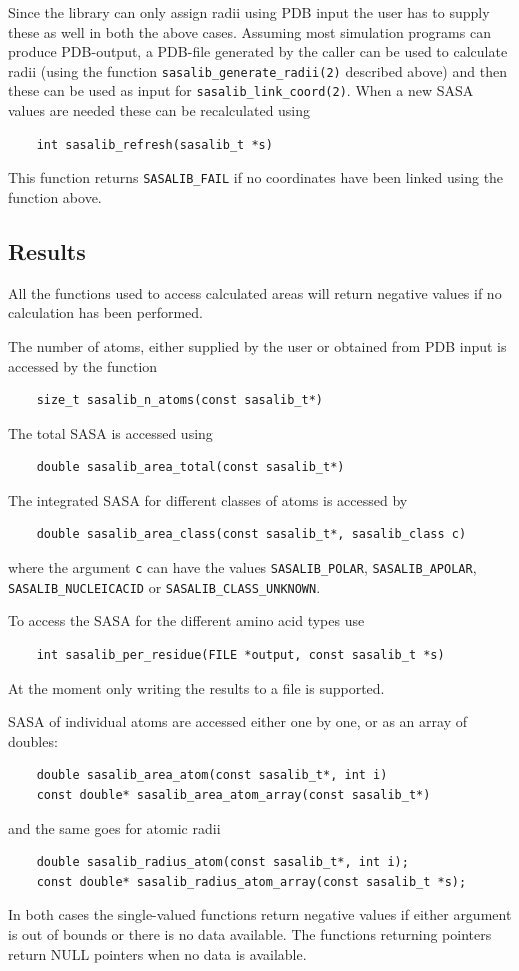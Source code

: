 \documentclass[a4paper,11pt]{article}
\begin{document}
Since the library can only assign radii using PDB input the user has
to supply these as well in both the above cases. Assuming most
simulation programs can produce PDB-output, a PDB-file generated by
the caller can be used to calculate radii (using the function
\texttt{sasalib\_generate\_radii(2)} described above) and then these
can be used as input for \texttt{sasalib\_link\_coord(2)}. When a new
SASA values are needed these can be recalculated using
\begin{verbatim} 
    int sasalib_refresh(sasalib_t *s)
\end{verbatim}
This function returns \texttt{SASALIB\_FAIL} if no coordinates have
been linked using the function above.

\subsection{Results}

All the functions used to access calculated areas will return negative
values if no calculation has been performed.

The number of atoms, either supplied by the user or obtained from PDB input
is accessed by the function
\begin{verbatim}
    size_t sasalib_n_atoms(const sasalib_t*)
\end{verbatim}
The total SASA is accessed using
\begin{verbatim}
    double sasalib_area_total(const sasalib_t*)
\end{verbatim}
The integrated SASA for different classes of atoms is accessed by
\begin{verbatim}
    double sasalib_area_class(const sasalib_t*, sasalib_class c)
\end{verbatim}
where the argument \verb|c| can have the values \verb|SASALIB_POLAR|, 
\verb|SASALIB_APOLAR|, \verb|SASALIB_NUCLEICACID| or 
\verb|SASALIB_CLASS_UNKNOWN|.

To access the SASA for the different amino acid types use
\begin{verbatim}
    int sasalib_per_residue(FILE *output, const sasalib_t *s)
\end{verbatim}
At the moment only writing the results to a file is
supported. 

SASA of individual atoms are accessed either one by one, or
as an array of doubles:
\begin{verbatim}
    double sasalib_area_atom(const sasalib_t*, int i)
    const double* sasalib_area_atom_array(const sasalib_t*)
\end{verbatim}
and the same goes for atomic radii
\begin{verbatim}
    double sasalib_radius_atom(const sasalib_t*, int i);
    const double* sasalib_radius_atom_array(const sasalib_t *s);
\end{verbatim}
In both cases the single-valued functions return negative values if
either argument is out of bounds or there is no data available. The
functions returning pointers return NULL pointers when no data is
available.
\end{document}
